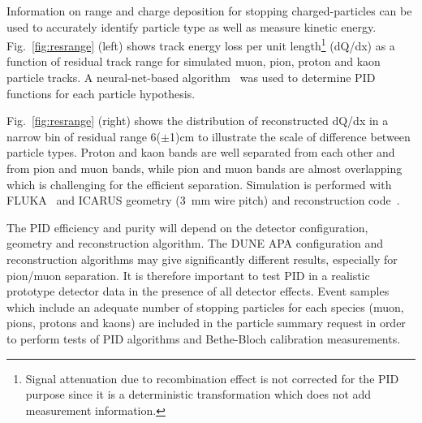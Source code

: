 \begin{itemize}
Information on range and charge deposition for stopping charged-particles can be used to 
accurately identify particle type as well as measure kinetic energy. 
Fig.~\ref{fig:resrange}  (left) shows track energy loss per unit length\footnote{Signal attenuation due to recombination effect is not corrected for the PID purpose since it is a deterministic transformation which does not add measurement information.}
(dQ/dx) as a function of residual 
track range for simulated muon, pion, proton and kaon particle tracks. 
A neural-net-based algorithm~\cite{nn_pid,rd_pid}
was used to determine PID functions for each particle hypothesis.

Fig.~\ref{fig:resrange} (right) 
shows the distribution of reconstructed dQ/dx in a narrow bin of residual range 6($\pm$1)cm to illustrate the scale of difference between particle types. Proton and kaon bands are well separated from each other and from pion and muon bands, while pion and muon bands are almost overlapping which is challenging for the efficient separation. 
Simulation is performed with
FLUKA~\cite{fluka05} and ICARUS geometry (3~mm wire pitch) and reconstruction code~\cite{icarus_reco}.


The PID efficiency and purity will  depend on the detector configuration, geometry and 
reconstruction algorithm. The DUNE APA configuration and reconstruction algorithms
may give significantly different results, especially for pion/muon separation. 
It is therefore important to test PID in a realistic prototype detector
data in the presence of all detector effects.
Event samples which include an adequate number of stopping particles for each species
(muon, pions, protons and kaons) are included in the particle summary request in order to 
perform tests of PID algorithms and Bethe-Bloch calibration measurements.


\end{itemize}
